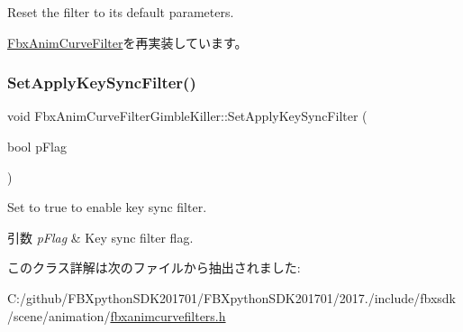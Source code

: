 Reset the filter to its default parameters. 

\hyperlink{class_fbx_anim_curve_filter_a57fb35baaaa85adb08946383cf40e811}{Fbx\+Anim\+Curve\+Filter}を再実装しています。

\mbox{\label{class_fbx_anim_curve_filter_gimble_killer_a39cedf804e69f86d5d2e8a95d92f98f2}} 
\subsubsection{\texorpdfstring{Set\+Apply\+Key\+Sync\+Filter()}{SetApplyKeySyncFilter()}}
{\footnotesize\ttfamily void Fbx\+Anim\+Curve\+Filter\+Gimble\+Killer\+::\+Set\+Apply\+Key\+Sync\+Filter (\begin{DoxyParamCaption}\item[{bool}]{p\+Flag }\end{DoxyParamCaption})}

Set to {\ttfamily true} to enable key sync filter. 
\begin{DoxyParams}{引数}
{\em p\+Flag} & Key sync filter flag. \\
\hline
\end{DoxyParams}


このクラス詳解は次のファイルから抽出されました\+:\begin{DoxyCompactItemize}
\item 
C\+:/github/\+F\+B\+Xpython\+S\+D\+K201701/\+F\+B\+Xpython\+S\+D\+K201701/2017./include/fbxsdk/scene/animation/\hyperlink{fbxanimcurvefilters_8h}{fbxanimcurvefilters.\+h}\end{DoxyCompactItemize}

